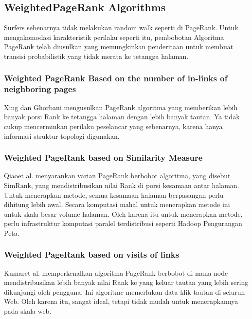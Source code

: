 \documentclass[conference]{IEEEtran}
\begin{document}
\subsection{WeightedPageRank Algorithms}
Surfers sebenarnya tidak melakukan random walk seperti di PageRank.
Untuk mengakomodasi karakteristik perilaku seperti itu, pembobotan
Algoritma PageRank telah diusulkan yang memungkinkan penderitaan
untuk membuat transisi probabilistik yang tidak merata ke tetangga
halaman.\cite{xing2004weighted,qiao2010simrank,kumar2011page}\\

\subsubsection{Weighted PageRank Based on the number of in-links of neighboring pages}
\noindent

Xing dan Ghorbani\cite{xing2004weighted} mengusulkan PageRank
algoritma yang memberikan lebih banyak porsi Rank ke tetangga
halaman dengan lebih banyak tautan. Ya tidak cukup
mencerminkan perilaku peselancar yang sebenarnya, karena hanya
informasi struktur topologi digunakan.\\


\subsubsection{Weighted PageRank based on Similarity Measure}
\noindent

Qiaoet al.\cite{qiao2010simrank} menyarankan varian PageRank berbobot
algoritma, yang disebut SimRank, yang mendistribusikan nilai Rank di
porsi kesamaan antar halaman. Untuk menerapkan metode,
semua kesamaan halaman berpasangan perlu dihitung lebih awal.
Secara komputasi mahal untuk menerapkan metode ini untuk skala besar
volume halaman. Oleh karena itu untuk menerapkan metode, perlu
infrastruktur komputasi paralel terdistribusi seperti Hadoop
Pengurangan Peta\cite{dean2008mapreduce}.\\

\subsubsection{Weighted PageRank based on visits of links}
\noindent

Kumaret al.\cite{kumar2011page} memperkenalkan algoritma PageRank 
berbobot di mana node mendistribusikan lebih banyak nilai Rank ke yang keluar
tautan yang lebih sering dikunjungi oleh pengguna. Ini
algoritme memerlukan data klik tautan di seluruh
Web. Oleh karena itu, sangat ideal, tetapi tidak mudah untuk menerapkannya pada
skala web.\\
\end{document}
